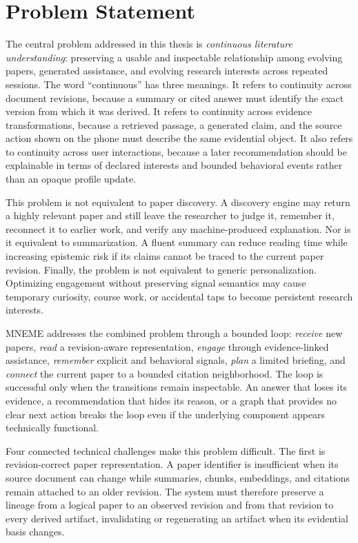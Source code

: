 \section{Problem Statement}

The central problem addressed in this thesis is \emph{continuous literature understanding}: preserving a usable and inspectable relationship among evolving papers, generated assistance, and evolving research interests across repeated sessions.
The word ``continuous'' has three meanings.
It refers to continuity across document revisions, because a summary or cited answer must identify the exact version from which it was derived.
It refers to continuity across evidence transformations, because a retrieved passage, a generated claim, and the source action shown on the phone must describe the same evidential object.
It also refers to continuity across user interactions, because a later recommendation should be explainable in terms of declared interests and bounded behavioral events rather than an opaque profile update.

This problem is not equivalent to paper discovery.
A discovery engine may return a highly relevant paper and still leave the researcher to judge it, remember it, reconnect it to earlier work, and verify any machine-produced explanation.
Nor is it equivalent to summarization.
A fluent summary can reduce reading time while increasing epistemic risk if its claims cannot be traced to the current paper revision.
Finally, the problem is not equivalent to generic personalization.
Optimizing engagement without preserving signal semantics may cause temporary curiosity, course work, or accidental taps to become persistent research interests.

MNEME addresses the combined problem through a bounded loop:
\emph{receive} new papers, \emph{read} a revision-aware representation, \emph{engage} through evidence-linked assistance, \emph{remember} explicit and behavioral signals, \emph{plan} a limited briefing, and \emph{connect} the current paper to a bounded citation neighborhood.
The loop is successful only when the transitions remain inspectable.
An answer that loses its evidence, a recommendation that hides its reason, or a graph that provides no clear next action breaks the loop even if the underlying component appears technically functional.

Four connected technical challenges make this problem difficult.
The first is revision-correct paper representation.
A paper identifier is insufficient when its source document can change while summaries, chunks, embeddings, and citations remain attached to an older revision.
The system must therefore preserve a lineage from a logical paper to an observed revision and from that revision to every derived artifact, invalidating or regenerating an artifact when its evidential basis changes.

